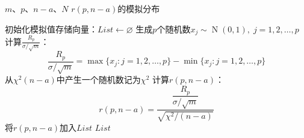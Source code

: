 \begin{algorithm}[H]
	\caption{Duncan多重比较法统计量分布的蒙特卡洛模拟}
	\label{alg:DuncanMonteCarlo}
	\begin{algorithmic}[1]
		\Require $m$、$p$、$n-a$、$N$ 
		\Ensure $r(p,n-a)$的模拟分布
		
		\State 初始化模拟值存储向量：$List\gets\varnothing$
			\State 生成$p$个随机数$x_j\sim\operatorname{N}(0,1),\;j=1,2,\dots,p$
			\State 计算$\frac{R_p}{\sigma/\sqrt{m}}$：
			\begin{equation*}
				\frac{R_p}{\sigma/\sqrt{m}}=\max\{x_j:j=1,2,\dots,p\}-\min\{x_j:j=1,2,\dots,p\}
			\end{equation*}
			\State 从$\chi^2(n-a)$中产生一个随机数记为$\chi^2$
			\State 计算$r(p,n-a)$：
			\begin{equation*}
				r(p,n-a)=\frac{\dfrac{R_p}{\sigma/\sqrt{m}}}{\sqrt{\chi^2/(n-a)}}
			\end{equation*}
			\State 将$r(p,n-a)$加入$List$
		\EndFor
		\State \Return $List$
	\end{algorithmic}
\end{algorithm}
